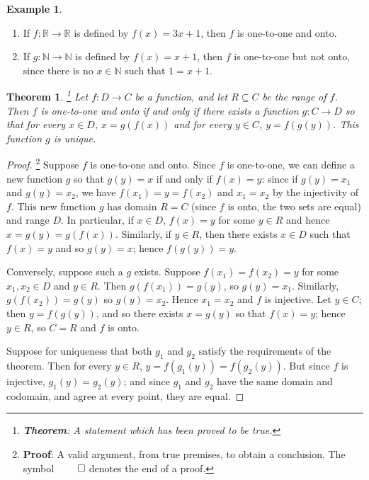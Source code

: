 \documentclass[a4paper,leqno]{article}
\numberwithin{equation}{section}
\newtheorem{thm}[equation]{Theorem}
\theoremstyle{definition}
\newtheorem{ex}[equation]{Example}
\theoremstyle{remark}
\newcommand{\df}[1]{\textbf{#1}}
\begin{document}
\begin{ex}\leavevmode
  \begin{enumerate}
    \item If $ f : \mathbb{R} \to \mathbb{R} $ is defined by $ f(x) = 3x + 1 $, then $ f $ is one-to-one and onto.
    \item If $ g : \mathbb{N} \to \mathbb{N} $ is defined by $ f(x) = x + 1 $, then $ f $ is one-to-one but not onto, since there is no $ x \in \mathbb{N} $
          such that $ 1 = x + 1 $.
  \end{enumerate}
\end{ex}

\begin{thm}\footnote{\df{Theorem}: A statement which has been proved to be true.}
  Let $ f : D \to C $ be a function, and let $ R \subseteq C $ be the range of $ f $. Then $ f $ is one-to-one and onto if and only if there exists a
  function $ g : C \to D $ so that for every $ x \in D $, $ x = g(f(x)) $ and for every $ y \in C $, $ y = f(g(y)) $. This function $ g $ is unique.
\end{thm}
\begin{proof}\footnote{\df{Proof}: A valid argument, from true premises, to obtain a conclusion. The symbol $ \qed $ denotes the end of a proof.}
  Suppose $ f $ is one-to-one and onto. Since $ f $ is one-to-one, we can define a new function $ g $ so that $ g(y) = x $ if and only if $ f(x) = y $:
  since if $ g(y) = x_1 $ and $ g(y) = x_2 $, we have $ f(x_1) = y = f(x_2) $ and $ x_1 = x_2 $ by the injectivity of $ f $. This new function $ g $
  has domain $ R = C $ (since $ f $ is onto, the two sets are equal) and range $ D $. In particular, if $ x \in D $, $ f(x) = y $ for some $ y \in R $
  and hence $ x = g(y) = g(f(x)) $. Similarly, if $ y \in R $, then there exists $ x \in D $ such that $ f(x) = y $ and so $ g(y) = x $; hence $ f(g(y)) = y $.

  Conversely, suppose such a $ g $ exists. Suppose $ f(x_1) = f(x_2) = y $ for some $ x_1, x_2 \in D $ and $ y \in R $. Then $ g(f(x_1)) = g(y) $, so $ g(y) = x_1 $.
  Similarly, $ g(f(x_2)) = g(y) $ so $ g(y) = x_2 $. Hence $ x_1 = x_2 $ and $ f $ is injective. Let $ y \in C $; then $ y = f(g(y)) $, and so there
  exists $ x = g(y) $ so that $ f(x) = y $; hence $ y \in R $, so $ C = R $ and $ f $ is onto.

  Suppose for uniqueness that both $ g_1 $ and $ g_2 $ satisfy the requirements of the theorem. Then for every $ y \in R $,  $ y = f(g_1(y)) = f(g_2(y)) $. But
  since $ f $ is injective, $ g_1(y) = g_2(y) $; and since $ g_1 $ and $ g_2 $ have the same domain and codomain, and agree at every point, they are equal.
\end{proof}
\end{document}

